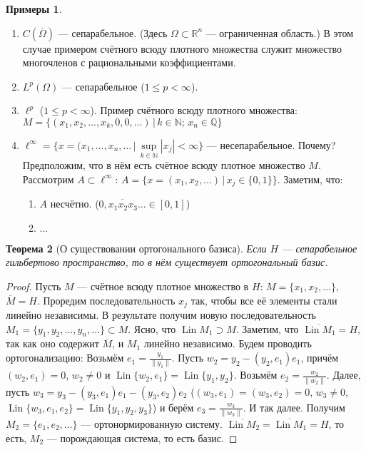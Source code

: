 \documentclass[11pt,openany,a4paper]{scrartcl}
\theoremstyle{plain}
\newtheorem{theorem}{Теорема}[section]
\theoremstyle{definition}
\newtheorem{examples}[theorem]{Примеры}
\newcommand\mb{\mathbb}
\newcommand\real{\mb R}
\newcommand\ol{\overline}
\DeclareMathOperator{\Lin}{Lin}
\begin{document}
\begin{examples}
\mbox{}
    \begin{enumerate}
        \item $C(\ol \Omega)$ — сепарабельное.
        (Здесь $\Omega \subset \real^n$ — ограниченная область.)
        В этом случае примером счётного всюду плотного множества служит множество
        многочленов с рациональными коэффициентами.
        \item $L^p(\Omega)$ — сепарабельное ($1 \leqslant p < \infty$).
        \item $\ell^p$ ($1 \leqslant p < \infty$). Пример счётного всюду
        плотного множества:
        $M = \{(x_1, x_2,\ldots,x_k, 0, 0, \ldots)\,\big|\,
        k \in \mb N;\, x_n \in \mb Q\}$
        \item $\ell^\infty = \{x = (x_1, \ldots, x_n, \ldots\,\big|\,
         \sup\limits_{k \in \mb N} |x_j| < \infty \}$ — несепарабельное. Почему?
         Предположим, что в нём есть счётное всюду плотное множество $M$.
         Рассмотрим $A \subset \ell^\infty$: $A = \{x = (x_1, x_2,\ldots)\,\big|\,
         x_j \in \{0, 1\}\}$. Заметим, что:
         \begin{enumerate}
            \item $A$ несчётно. ($\ol{0,x_1x_2x_3\ldots} \in [0, 1]$)
            \item $\ldots$
         \end{enumerate}
    \end{enumerate}
\end{examples}

\begin{theorem}[О существовании ортогонального базиса]
    Если $H$ — сепарабельное гильбертово пространство, то в нём существует
    ортогональный базис.
\end{theorem}
\begin{proof}
    Пусть $M$ — счётное всюду плотное множество в $H$:
    $M = \{x_1, x_2, \ldots\}$, $\ol M = H$. Проредим последовательность $x_j$
    так, чтобы все её элементы стали линейно независимы. В результате получим
    новую последовательность $M_1 = \{y_1, y_2,\ldots,y_n,\ldots\} \subset M$.
    Ясно, что $\Lin M_1 \supset M$. Заметим, что $\ol{\Lin M_1} = H$, так как оно
    содержит $\ol M$, и $M_1$ линейно независимо. Будем проводить ортогонализацию:
    Возьмём $e_1 = \frac{y_1}{\|y_1\|}$. Пусть $w_2 = y_2 - (y_2, e_1)e_1$, причём
    $(w_2, e_1) = 0$, $w_2 \neq 0$ и $\Lin\{w_2, e_1\} = \Lin \{y_1, y_2\}$.
    Возьмём $e_2 = \frac{w_2}{\|w_2\|}$. Далее, пусть $w_3 = y_3 - (y_3, e_1)e_1 -
    (y_3, e_2)e_2$ ($(w_3, e_1) = (w_3, e_2) = 0$, $w_3 \neq 0$,
    $\Lin\{w_3, e_1, e_2\} = \Lin\{y_1, y_2, y_3\}$) и берём
    $e_3 = \frac{w_3}{\|w_3\|}$. И так далее. Получим
    $M_2 = \{e_1, e_2, \ldots\}$ — ортонормированную систему.
    $\ol{\Lin M_2} = \ol{\Lin M_1} = H$, то есть, $M_2$ — порождающая система,
    то есть базис.
\end{proof}
\end{document}
